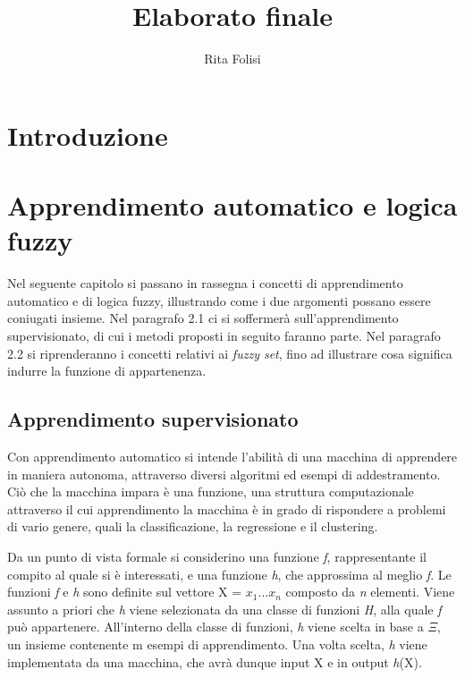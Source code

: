 \documentclass[11pt]{article}
\title{Elaborato finale}
\date{}
\author{Rita Folisi}
\begin{document}

  \begin{titlepage}
    
    \newpage
    \tableofcontents
    \thispagestyle{empty}
  \end{titlepage}




	\section{Introduzione}
	\section{Apprendimento automatico e logica fuzzy}
Nel seguente capitolo si passano in rassegna i concetti di apprendimento automatico e di logica fuzzy, illustrando come i due argomenti possano essere coniugati insieme. Nel paragrafo 2.1 ci si soffermerà sull'apprendimento supervisionato, di cui i metodi proposti in seguito faranno parte. Nel paragrafo 2.2 si riprenderanno i concetti relativi ai \textit {fuzzy set}, fino ad illustrare cosa significa indurre la funzione di appartenenza. 

	\subsection{Apprendimento supervisionato}

Con apprendimento automatico si intende l'abilità di una macchina di apprendere in maniera autonoma, attraverso diversi algoritmi ed esempi di addestramento. Ciò che la macchina impara è una funzione, una struttura computazionale attraverso il cui apprendimento la macchina è in grado di rispondere a problemi di vario genere, quali la classificazione, la regressione e il clustering.

Da un punto di vista formale\cite {mlstanford} si considerino una funzione  \textit {f}, rappresentante il compito al quale si è interessati, e una funzione \textit {h}, che approssima al meglio \textit {f}. Le funzioni \textit {f} e \textit {h} sono definite sul vettore X = {$x_1...x_n$} composto da \textit {n} elementi. Viene assunto a priori che \textit {h} viene selezionata da una classe di funzioni \textit {H}, alla quale \textit {f} può appartenere. All'interno della classe di funzioni, \textit {h} viene scelta in base a 
$\Xi$, un insieme contenente {m} esempi di apprendimento. Una volta scelta, \textit {h} viene implementata da una macchina, che avrà dunque input X e in output \textit {h}(X). 
\end{document}
